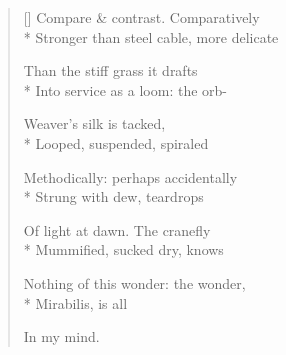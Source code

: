 \begin{verse}[\versewidth]
Compare \& contrast. \qquad Comparatively\\*
Stronger than steel cable, more delicate

Than the stiff grass it drafts\\*
Into service as a loom: the orb-

Weaver's silk is tacked,\\*
Looped, suspended, spiraled

Methodically: perhaps accidentally\\*
Strung with dew, teardrops 

Of light at dawn.  The cranefly\\*
Mummified, sucked dry, knows

Nothing of this wonder: the wonder,\\*
Mirabilis, is all 

In my mind.
\end{verse}
